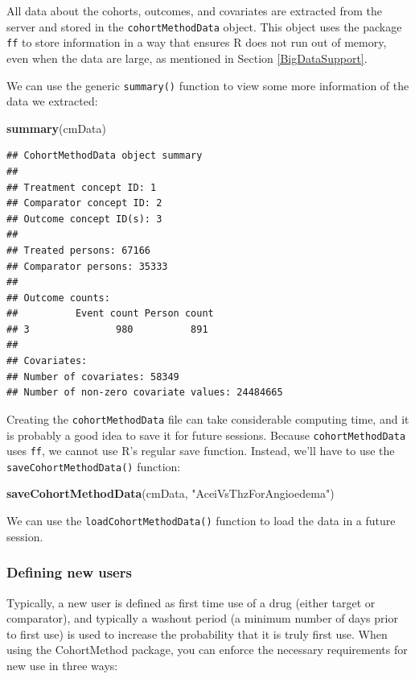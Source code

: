 \documentclass[11pt]{book}
\newenvironment{Shaded}{\begin{snugshade}}{\end{snugshade}}
\newcommand{\KeywordTok}[1]{\textcolor[rgb]{0.13,0.29,0.53}{\textbf{#1}}}
\newcommand{\NormalTok}[1]{#1}
\newcommand{\StringTok}[1]{\textcolor[rgb]{0.31,0.60,0.02}{#1}}
\theoremstyle{definition}
\theoremstyle{definition}
\theoremstyle{definition}
\theoremstyle{remark}
\begin{document}
All data about the cohorts, outcomes, and covariates are extracted from the server and stored in the \texttt{cohortMethodData} object. This object uses the package \texttt{ff} to store information in a way that ensures R does not run out of memory, even when the data are large, as mentioned in Section \ref{BigDataSupport}.

We can use the generic \texttt{summary()} function to view some more information of the data we extracted:

\begin{Shaded}
\begin{Highlighting}[]
\KeywordTok{summary}\NormalTok{(cmData)}
\end{Highlighting}
\end{Shaded}

\begin{verbatim}
## CohortMethodData object summary
## 
## Treatment concept ID: 1
## Comparator concept ID: 2
## Outcome concept ID(s): 3
## 
## Treated persons: 67166
## Comparator persons: 35333
## 
## Outcome counts:
##          Event count Person count
## 3               980          891
## 
## Covariates:
## Number of covariates: 58349
## Number of non-zero covariate values: 24484665
\end{verbatim}

Creating the \texttt{cohortMethodData} file can take considerable computing time, and it is probably a good idea to save it for future sessions. Because \texttt{cohortMethodData} uses \texttt{ff}, we cannot use R's regular save function. Instead, we'll have to use the \texttt{saveCohortMethodData()} function:

\begin{Shaded}
\begin{Highlighting}[]
\KeywordTok{saveCohortMethodData}\NormalTok{(cmData, }\StringTok{"AceiVsThzForAngioedema"}\NormalTok{)}
\end{Highlighting}
\end{Shaded}

We can use the \texttt{loadCohortMethodData()} function to load the data in a future session.

\hypertarget{defining-new-users}{%
\subsubsection*{Defining new users}\label{defining-new-users}}

Typically, a new user is defined as first time use of a drug (either target or comparator), and typically a washout period (a minimum number of days prior to first use) is used to increase the probability that it is truly first use. When using the CohortMethod package, you can enforce the necessary requirements for new use in three ways:
\end{document}
